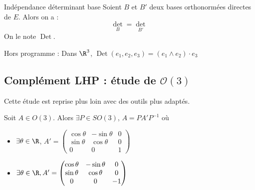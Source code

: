 \begin{proposition}{Indépendance déterminant base}{}
    Soient $B$ et $B'$ deux bases orthonormées directes de $E$. Alors on a : 
    $$\det_B = \det_{B'}$$
    On le note $\operatorname{Det}$. 
\end{proposition}

\begin{remarque}
    Hors programme : Dans $\R^3$, $\operatorname{Det} (e_1, e_2, e_3) = (e_1 \wedge e_2) \cdot e_3$
\end{remarque}

\subsection{Complément LHP : étude de \texorpdfstring{$\mathcal O(3)$}{O(3)}}

Cette étude est reprise plus loin avec des outils plus adaptés. 

Soit $A \in O(3)$. Alors $\exists P \in SO(3)$, $A = PA'P^{-1}$ où 

\begin{itemize}
    \item $\exists \theta \in \R$, $A' = \begin{pmatrix}
        \cos \theta & -\sin \theta & 0 \\
        \sin \theta & \cos \theta & 0 \\
        0 & 0 & 1
    \end{pmatrix}$
    \item $\exists \theta \in \R, A' = \begin{pmatrix}
        \cos \theta & -\sin \theta & 0 \\
        \sin \theta & \cos \theta & 0 \\
        0 & 0 & -1
    \end{pmatrix}$
\end{itemize}


